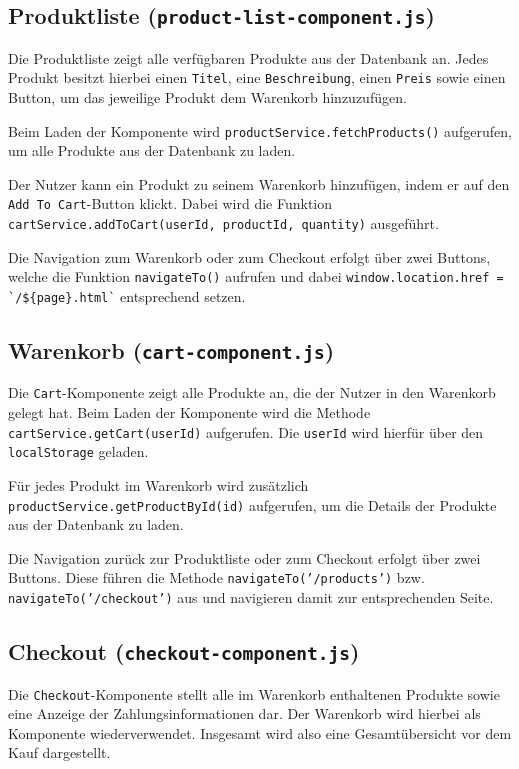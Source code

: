 \documentclass[oneside]{ausarbeitung}
\begin{document}
\subsection{Produktliste (\texttt{product-list-component.js})}

Die Produktliste zeigt alle verfügbaren Produkte aus der Datenbank an. Jedes Produkt besitzt hierbei einen \texttt{Titel}, eine \texttt{Beschreibung}, einen \texttt{Preis} sowie einen Button, um das jeweilige Produkt dem Warenkorb hinzuzufügen. 

Beim Laden der Komponente wird \texttt{productService.fetchProducts()} aufgerufen, um alle Produkte aus der Datenbank zu laden.

Der Nutzer kann ein Produkt zu seinem Warenkorb hinzufügen, indem er auf den \texttt{Add To Cart}-Button klickt. Dabei wird die Funktion \texttt{cartService.addToCart(userId, productId, quantity)} ausgeführt.

Die Navigation zum Warenkorb oder zum Checkout erfolgt über zwei Buttons, welche die Funktion \texttt{navigateTo()} aufrufen und dabei \texttt{window.location.href = \`{}/\$\{page\}.html\`} entsprechend setzen.


\subsection{Warenkorb (\texttt{cart-component.js})}

Die \texttt{Cart}-Komponente zeigt alle Produkte an, die der Nutzer in den Warenkorb gelegt hat. Beim Laden der Komponente wird die Methode \texttt{cartService.getCart(userId)} aufgerufen. Die \texttt{userId} wird hierfür über den \texttt{localStorage} geladen. 

Für jedes Produkt im Warenkorb wird zusätzlich \texttt{productService.getProductById(id)} aufgerufen, um die Details der Produkte aus der Datenbank zu laden.

Die Navigation zurück zur Produktliste oder zum Checkout erfolgt über zwei Buttons. Diese führen die Methode \texttt{navigateTo('/products')} bzw. \texttt{navigateTo('/checkout')} aus und navigieren damit zur entsprechenden Seite.


\subsection{Checkout (\texttt{checkout-component.js})}

Die \texttt{Checkout}-Komponente stellt alle im Warenkorb enthaltenen Produkte sowie eine Anzeige der Zahlungsinformationen dar. Der Warenkorb wird hierbei als Komponente wiederverwendet. Insgesamt wird also eine Gesamtübersicht vor dem Kauf dargestellt.
\end{document}
